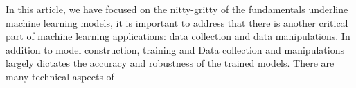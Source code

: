In this article, we have focused on the nitty-gritty of the fundamentals underline machine learning models, it is important to address that there is another critical part of machine learning applications: data collection and data manipulations. In addition to model construction, training and  Data collection and manipulations largely dictates the accuracy and robustness of the trained models. There are many technical aspects of 